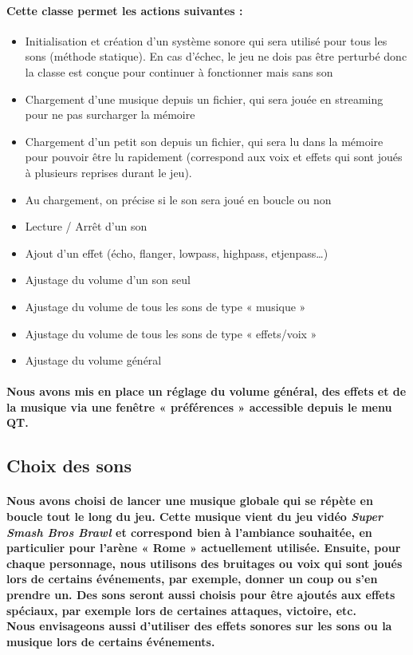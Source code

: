 \paragraph{Cette classe permet les actions suivantes :}
\begin{itemize}
	\item Initialisation et création d’un système sonore qui sera utilisé pour tous les sons (méthode statique). En cas d’échec, le jeu ne dois pas être perturbé donc la classe est conçue pour continuer à fonctionner mais sans son
	\item Chargement d’une musique depuis un fichier, qui sera jouée en streaming pour ne pas surcharger la mémoire
	\item Chargement d’un petit son depuis un fichier, qui sera lu dans la mémoire pour pouvoir être lu rapidement (correspond aux voix et effets qui sont joués à plusieurs reprises durant le jeu).
	\item Au chargement, on précise si le son sera joué en boucle ou non
	\item Lecture / Arrêt d’un son
	\item Ajout d’un effet (écho, flanger, lowpass, highpass, etjenpass…)
	\item Ajustage du volume d’un son seul
	\item Ajustage du volume de tous les sons de type « musique »
	\item Ajustage du volume de tous les sons de type « effets/voix »
	\item Ajustage du volume général
\end{itemize}

\paragraph{Nous avons mis en place un réglage du volume général, des effets et de la musique via une fenêtre « préférences » accessible depuis le menu QT.}


\subsection{Choix des sons}
\paragraph{Nous avons choisi de lancer une musique globale qui se répète en boucle tout le long du jeu. Cette musique vient du jeu vidéo \textit{Super Smash Bros Brawl} et correspond bien à l’ambiance souhaitée, en particulier pour l’arène « Rome » actuellement utilisée.
Ensuite, pour chaque personnage, nous utilisons des bruitages ou voix qui sont joués lors de certains événements, par exemple, donner un coup ou s'en prendre un. Des sons seront aussi choisis pour être ajoutés aux effets spéciaux, par exemple lors de certaines attaques, victoire, etc.\\
Nous envisageons aussi d’utiliser des effets sonores sur les sons ou la musique lors de certains événements.}




